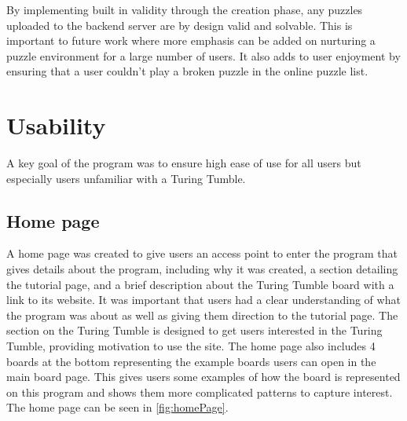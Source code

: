 \documentclass{l4proj}
\begin{document}
By implementing built in validity through the creation phase, any puzzles uploaded to the backend server are by design valid and solvable. This is important to future work where more emphasis can be added on nurturing a puzzle environment for a large number of users. It also adds to user enjoyment by ensuring that a user couldn't play a broken puzzle in the online puzzle list.



\section{Usability}
A key goal of the program was to ensure high ease of use for all users but especially users unfamiliar with a Turing Tumble. 

\subsection{Home page}
A home page was created to give users an access point to enter the program that gives details about the program, including why it was created, a section detailing the tutorial page, and a brief description about the Turing Tumble board with a link to its website. It was important that users had a clear understanding of what the program was about as well as giving them direction to the tutorial page. The section on the Turing Tumble is designed to get users interested in the Turing Tumble, providing motivation to use the site. The home page also includes 4 boards at the bottom representing the example boards users can open in the main board page. This gives users some examples of how the board is represented on this program and shows them more complicated patterns to capture interest. The home page can be seen in \ref{fig:homePage}.
\end{document}
